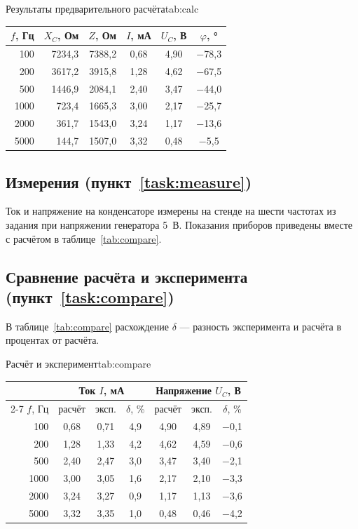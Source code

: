 \begin{bbttable}{Результаты предварительного расчёта}{tab:calc}
  \begin{tabular}{|r|r|r|c|c|c|}
    \hline
    $f$, Гц & $X_C$, Ом & $Z$, Ом & $I$, мА & $U_C$, В & $\varphi$, ° \\ \hline
    100  & 7234,3 & 7388,2 & 0,68 & 4,90 & −78,3 \\ \hline
    200  & 3617,2 & 3915,8 & 1,28 & 4,62 & −67,5 \\ \hline
    500  & 1446,9 & 2084,1 & 2,40 & 3,47 & −44,0 \\ \hline
    1000 & 723,4  & 1665,3 & 3,00 & 2,17 & −25,7 \\ \hline
    2000 & 361,7  & 1543,0 & 3,24 & 1,17 & −13,6 \\ \hline
    5000 & 144,7  & 1507,0 & 3,32 & 0,48 & −5,5  \\ \hline
  \end{tabular}
\end{bbttable}

\subsection{Измерения (пункт~\ref{task:measure})}
Ток и напряжение на конденсаторе измерены на стенде на шести частотах из задания при
напряжении генератора 5~В. Показания приборов приведены вместе с расчётом в
таблице~\ref{tab:compare}.

\subsection{Сравнение расчёта и эксперимента (пункт~\ref{task:compare})}
В таблице~\ref{tab:compare} расхождение $\delta$ — разность эксперимента и расчёта в
процентах от расчёта.

\begin{bbttable}{Расчёт и эксперимент}{tab:compare}
  \begin{tabular}{|r|c|c|c|c|c|c|}
    \hline
    & \multicolumn{3}{c|}{Ток $I$, мА} & \multicolumn{3}{c|}{Напряжение $U_C$, В} \\
    \cline{2-7}
    $f$, Гц & расчёт & эксп. & $\delta$, \% & расчёт & эксп. & $\delta$, \% \\ \hline
    100  & 0,68 & 0,71 & 4,9 & 4,90 & 4,89 & −0,1 \\ \hline
    200  & 1,28 & 1,33 & 4,2 & 4,62 & 4,59 & −0,6 \\ \hline
    500  & 2,40 & 2,47 & 3,0 & 3,47 & 3,40 & −2,1 \\ \hline
    1000 & 3,00 & 3,05 & 1,6 & 2,17 & 2,10 & −3,3 \\ \hline
    2000 & 3,24 & 3,27 & 0,9 & 1,17 & 1,13 & −3,6 \\ \hline
    5000 & 3,32 & 3,35 & 1,0 & 0,48 & 0,46 & −4,2 \\ \hline
  \end{tabular}
\end{bbttable}

